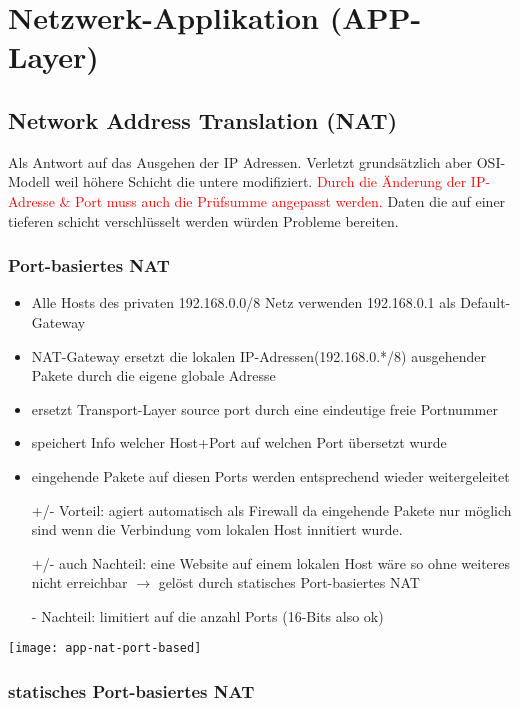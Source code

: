 \section{Netzwerk-Applikation (APP-Layer)}

\subsection{Network Address Translation (NAT)}

Als Antwort auf das Ausgehen der IP Adressen. Verletzt grundsätzlich aber
OSI-Modell weil höhere Schicht die untere modifiziert. \textcolor{red}{Durch die Änderung der IP-Adresse \& Port muss auch die Prüfsumme angepasst werden.}
Daten die auf einer tieferen schicht verschlüsselt werden würden Probleme bereiten.

\subsubsection{Port-basiertes NAT}
\begin{itemize}
	\item Alle Hosts des privaten 192.168.0.0/8 Netz verwenden 192.168.0.1
	      als Default-Gateway
	\item NAT-Gateway ersetzt die lokalen IP-Adressen(192.168.0.*/8) ausgehender
	      Pakete durch die eigene globale Adresse
	\item ersetzt Transport-Layer source port durch eine eindeutige freie Portnummer
	\item speichert Info welcher Host+Port auf welchen Port übersetzt wurde
	\item eingehende Pakete auf diesen Ports werden entsprechend wieder weitergeleitet
	\item[+/-] Vorteil: agiert automatisch als Firewall da eingehende Pakete nur
		möglich sind wenn die Verbindung vom lokalen Host innitiert wurde.
	\item[+/-] auch Nachteil: eine Website auf einem lokalen Host wäre so ohne weiteres
		nicht erreichbar $\rightarrow$ gelöst durch statisches Port-basiertes NAT
	\item[-] Nachteil: limitiert auf die anzahl Ports (16-Bits also ok)
\end{itemize}

\texttt{[image: app-nat-port-based]}


\subsubsection{statisches Port-basiertes NAT}

